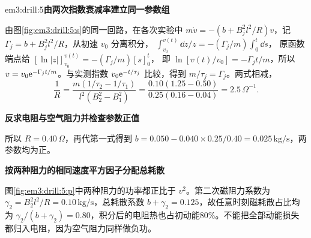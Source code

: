 \begin{drillsolution}{em3:drill:5}\textbf{由两次指数衰减率建立同一参数组}\par\nobreak
由图\ref{fig:em3:drill:5:s}的同一回路，在各次实验中 $m\dot v=-(b+B_j^2l^2/R)v$，记 $\Gamma_j=b+B_j^2l^2/R$，从初速 $v_0$ 分离积分，
$\int_{v_0}^{v(t)}\dd z/z=-(\Gamma_j/m)\int_0^t\dd s$，
原函数端点给 $[\ln|z|]_{v_0}^{v(t)}=-(\Gamma_j/m)[s]_0^t$，
即 $\ln[v(t)/v_0]=-\Gamma_jt/m$，所以 $v=v_0\mathrm e^{-\Gamma_jt/m}$。与实测指数 $v_0\mathrm e^{-t/\tau_j}$ 比较，得到 $m/\tau_j=\Gamma_j$。两式相减，
\[\frac1R=\frac{m(1/\tau_2-1/\tau_1)}{l^2(B_2^2-B_1^2)}=\frac{0.10(1.25-0.50)}{0.25(0.16-0.04)}=2.5\,\Omega^{-1}.\]


\par\medskip{}\noindent\textbf{反求电阻与空气阻力并检查参数正值}\par\nobreak
所以 $R=0.40\,\Omega$，再代第一式得到 $b=0.050-0.040\times0.25/0.40=0.025\,\mathrm{kg/s}$，两参数均为正。



\par\medskip{}\noindent\textbf{按两种阻力的相同速度平方因子分配总耗散}\par\nobreak
图\ref{fig:em3:drill:5:p}中两种阻力的功率都正比于 $v^2$。第二次磁阻力系数为 $\gamma_2=B_2^2l^2/R=0.10\,\mathrm{kg/s}$，总耗散系数 $b+\gamma_2=0.125$，故任意时刻磁耗散占比均为 $\gamma_2/(b+\gamma_2)=0.80$，积分后的电阻热也占初动能80\%。不能把全部动能损失都归入电阻，因为空气阻力同样做负功。\end{drillsolution}
